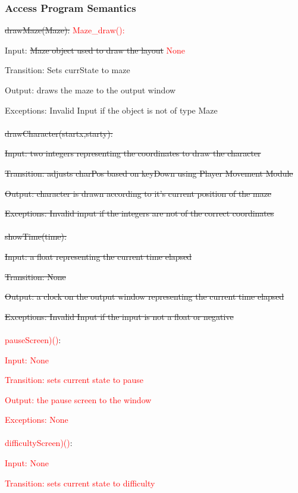 \documentclass[12pt, titlepage]{article}
\begin{document}
		\subsubsection{Access Program Semantics}
		
		\sout{drawMaze(Maze):} \textcolor{red}{Maze\_draw():}
		
		Input: \sout{Maze object used to draw the layout} \textcolor{red}{None}
		
		Transition: Sets currState to maze
		
		Output: draws the maze to the output window
		
		Exceptions: Invalid Input if the object is not of type Maze\\
		\\
		\sout{drawCharacter(startx,starty):}
		
		\sout{Input: two integers representing the coordinates to draw the character}
		
		\sout{Transition: adjusts charPos based on keyDown using Player Movement Module}
		
		\sout{Output: character is drawn according to it's current position of the maze}
		
		\sout{Exceptions: Invalid input if the integers are not of the correct coordinates}\\
		\\
		\sout{showTime(time):}
		
		\sout{Input: a float representing the current time elapsed}
		
		\sout{Transition: None}
		
		\sout{Output: a clock on the output window representing the current time elapsed}
		
		\sout{Exceptions: Invalid Input if the input is not a float or negative}\\
		\\
		\textcolor{red}{pauseScreen)()}:
		
		\textcolor{red}{Input: None}
		
		\textcolor{red}{Transition: sets current state to pause}
		
		\textcolor{red}{Output: the pause screen to the window}
		
		\textcolor{red}{Exceptions: None}\\
        \\
        \textcolor{red}{difficultyScreen)()}:
		
		\textcolor{red}{Input: None}
		
		\textcolor{red}{Transition: sets current state to difficulty}
		
\end{document}
